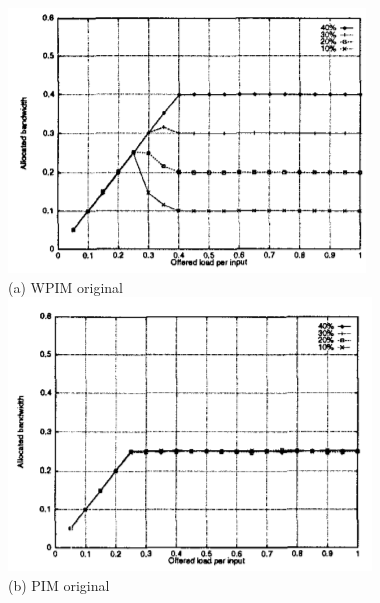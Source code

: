 \begin{figure}
    \centering
        \centering
        \includegraphics[width=\linewidth]{figures/stiliadis_fig6a_original.png}\\
        (a) WPIM original
    \endminipage\hfill
        \centering
        \includegraphics[width=\linewidth]{figures/stiliadis_fig6b_original.png}\\
        (b) PIM original
    \endminipage\hfill
        \centering

\end{figure}
